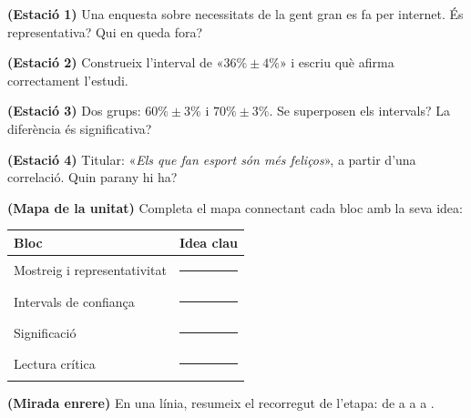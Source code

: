 \begin{exercicis}
\begin{exlist}
  \item \textbf{(Estació 1)} Una enquesta sobre necessitats de la gent gran es fa per
        internet. És representativa? Qui en queda fora?
  \item \textbf{(Estació 2)} Construeix l'interval de «$36\%\pm 4\%$» i escriu què afirma
        correctament l'estudi.
  \item \textbf{(Estació 3)} Dos grups: $60\%\pm 3\%$ i $70\%\pm 3\%$. Se superposen els
        intervals? La diferència és significativa?
  \item \textbf{(Estació 4)} Titular: «\emph{Els que fan esport són més feliços}», a partir
        d'una correlació. Quin parany hi ha?
  \item \textbf{(Mapa de la unitat)} Completa el mapa connectant cada bloc amb la seva idea:
        \begin{center}
        \renewcommand{\arraystretch}{1.4}
        \begin{tabular}{p{4.0cm} p{8.4cm}}
        \toprule
        \textbf{Bloc} & \textbf{Idea clau} \\
        \midrule
        Mostreig i representativitat & \rule{7.6cm}{0.4pt} \\
        Intervals de confiança & \rule{7.6cm}{0.4pt} \\
        Significació & \rule{7.6cm}{0.4pt} \\
        Lectura crítica & \rule{7.6cm}{0.4pt} \\
        \bottomrule
        \end{tabular}
        \end{center}
  \item \textbf{(Mirada enrere)} En una línia, resumeix el recorregut de l'etapa: de
        \underline{\hspace{2cm}} a \underline{\hspace{2cm}} a \underline{\hspace{2cm}} a
        \underline{\hspace{2cm}}.
\end{exlist}
\end{exercicis}

